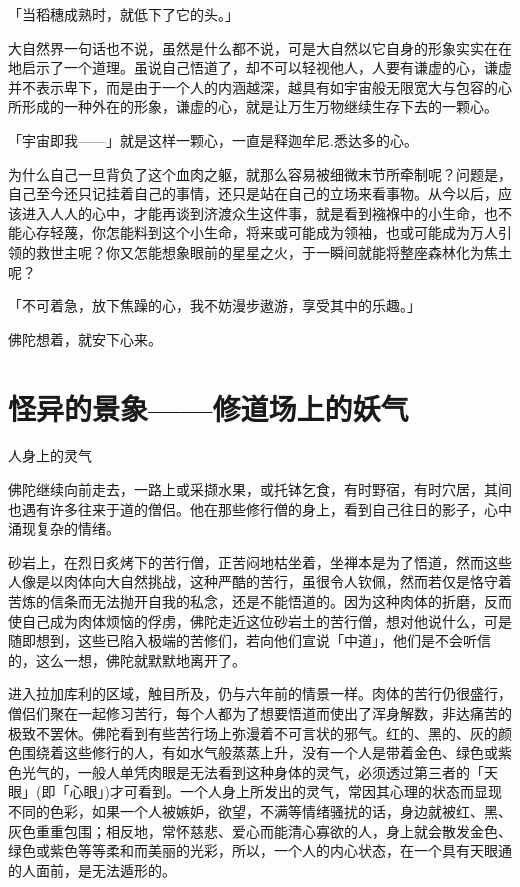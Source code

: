\documentclass[12pt,twoside,openany]{book}
\begin{document}
「当稻穗成熟时，就低下了它的头。」

大自然界一句话也不说，虽然是什么都不说，可是大自然以它自身的形象实实在在地启示了一个道理。虽说自己悟道了，却不可以轻视他人，人要有谦虚的心，谦虚并不表示卑下，而是由于一个人的内涵越深，越具有如宇宙般无限宽大与包容的心所形成的一种外在的形象，谦虚的心，就是让万生万物继续生存下去的一颗心。

「宇宙即我——」就是这样一颗心，一直是释迦牟尼.悉达多的心。

为什么自己一旦背负了这个血肉之躯，就那么容易被细微末节所牵制呢？问题是，自己至今还只记挂着自己的事情，还只是站在自己的立场来看事物。从今以后，应该进入人人的心中，才能再谈到济渡众生这件事，就是看到襁褓中的小生命，也不能心存轻蔑，你怎能料到这个小生命，将来或可能成为领袖，也或可能成为万人引领的救世主呢？你又怎能想象眼前的星星之火，于一瞬间就能将整座森林化为焦土呢？

「不可着急，放下焦躁的心，我不妨漫步遨游，享受其中的乐趣。」

佛陀想着，就安下心来。

\section{怪异的景象——修道场上的妖气}\label{sec2.3}

人身上的灵气

佛陀继续向前走去，一路上或采撷水果，或托钵乞食，有时野宿，有时穴居，其间也遇有许多往来于道的僧侣。他在那些修行僧的身上，看到自己往日的影子，心中涌现复杂的情绪。

砂岩上，在烈日炙烤下的苦行僧，正苦闷地枯坐着，坐禅本是为了悟道，然而这些人像是以肉体向大自然挑战，这种严酷的苦行，虽很令人钦佩，然而若仅是恪守着苦炼的信条而无法抛开自我的私念，还是不能悟道的。因为这种肉体的折磨，反而使自己成为肉体烦恼的俘虏，佛陀走近这位砂岩土的苦行僧，想对他说什么，可是随即想到，这些已陷入极端的苦修们，若向他们宣说「中道」，他们是不会听信的，这么一想，佛陀就默默地离开了。

进入拉加库利的区域，触目所及，仍与六年前的情景一样。肉体的苦行仍很盛行，僧侣们聚在一起修习苦行，每个人都为了想要悟道而使出了浑身解数，非达痛苦的极致不罢休。佛陀看到有些苦行场上弥漫着不可言状的邪气。红的、黑的、灰的颜色围绕着这些修行的人，有如水气般蒸蒸上升，没有一个人是带着金色、绿色或紫色光气的，一般人单凭肉眼是无法看到这种身体的灵气，必须透过第三者的「天眼」(即「心眼」)才可看到。一个人身上所发出的灵气，常因其心理的状态而显现不同的色彩，如果一个人被嫉妒，欲望，不满等情绪骚扰的话，身边就被红、黑、灰色重重包围；相反地，常怀慈悲、爱心而能清心寡欲的人，身上就会散发金色、绿色或紫色等等柔和而美丽的光彩，所以，一个人的内心状态，在一个具有天眼通的人面前，是无法遁形的。
\end{document}
